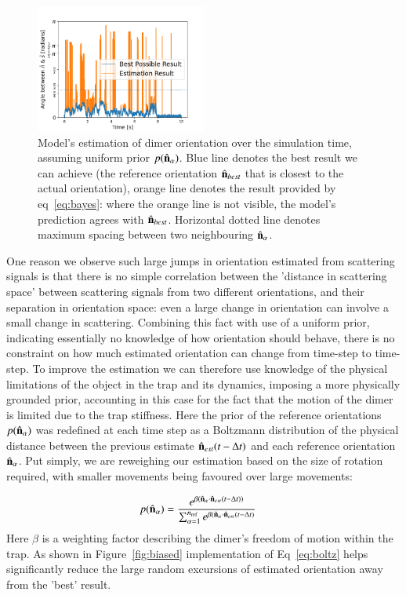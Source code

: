\documentclass[final,  3p]{elsarticle}
\begin{document}
\begin{figure}[h]
	\centering
	\includegraphics[width=0.5\textwidth]{./Images/fig3.png}
	\caption{Model's estimation of dimer orientation over the simulation time, assuming uniform prior $p(\hat{\bf n}_\alpha)$. Blue line denotes the best result we can achieve (the reference orientation $\hat{\bf n}_{best}$ that is closest to the actual orientation), orange line denotes the result provided by eq~\ref{eq:bayes}: where the orange line is not visible, the model's prediction agrees with $\hat{\bf n}_{best}$. Horizontal dotted line denotes maximum spacing between two neighbouring $\hat{\bf n}_\alpha$.}
	\label{fig:uniform}
\end{figure} 

One reason we observe such large jumps in orientation estimated from scattering signals is that there is no simple correlation between the 'distance in scattering space' between scattering signals from two different orientations, and their separation in orientation space: even a large change in orientation can involve a small change in scattering. Combining this fact with use of a uniform prior, indicating essentially no knowledge of how orientation should behave, there is no constraint on how much estimated orientation can change from time-step to time-step. To improve the estimation we can therefore use knowledge of the physical limitations of the object in the trap and its dynamics, imposing a more physically grounded prior, accounting in this case for the fact that the motion of the dimer is limited due to the trap stiffness. Here the prior of the reference orientations $p(\hat{\bf n}_\alpha)$ was redefined at each time step as a Boltzmann distribution of the physical distance between the previous estimate $\hat{\bf n}_{est}(t-\Delta t)$ and each reference orientation $\hat{\bf n}_\alpha$. Put simply, we are reweighing our estimation based on the size of rotation required, with smaller movements being favoured over large movements:

\begin{align}
  p(\hat{\bf n}_\alpha)
  &=\frac{e^{\beta (\hat{\bf n}_\alpha 
  	\cdot \hat{\bf n}_{est}(t-\Delta t))}}
  {\sum_{\alpha=1}^{n_{\rm ref}}
	e^{\beta (\hat{\bf n}_\alpha 
	\cdot \hat{\bf n}_{est}(t-\Delta t)}}
	\label{eq:boltz}
\end{align}
Here $\beta$ is a weighting factor describing the dimer's freedom of motion within the trap. As shown in Figure~\ref{fig:biased} implementation of Eq~\eqref{eq:boltz} helps significantly reduce the large random excursions of estimated orientation away from the 'best' result. 
\end{document}
